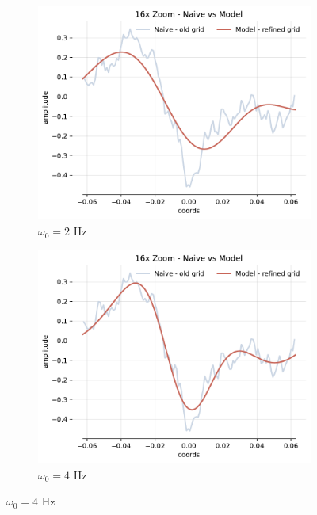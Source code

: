 \begin{figure}[h]
    \centering
    \begin{subfigure}[b]{0.32\textwidth}
        \centering
        \includegraphics[width=\textwidth]{img/ch3/16x-zoom-1hl-16hf-2hz.pdf}
        \caption{$\omega_0=2$ Hz}
    \end{subfigure}
    \begin{subfigure}[b]{0.32\textwidth}
        \centering
        \includegraphics[width=\textwidth]{img/ch3/16x_zoom-1hl-16hf-4hz.pdf}
        \caption{$\omega_0=4$ Hz}
    \end{subfigure}

\end{figure}
